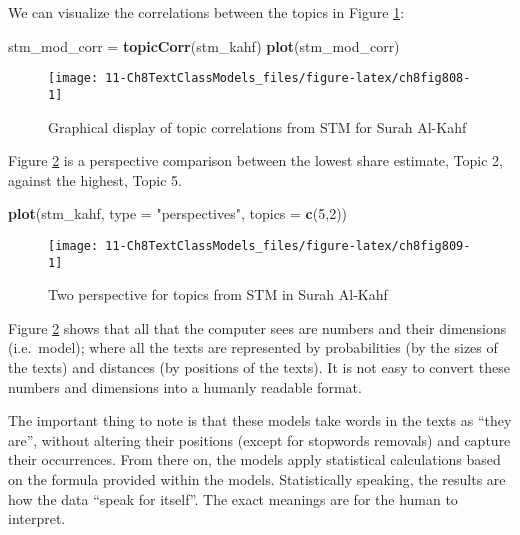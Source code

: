 \documentclass[
]{article}
\newenvironment{Shaded}{\begin{snugshade}}{\end{snugshade}}
\newcommand{\AttributeTok}[1]{\textcolor[rgb]{0.13,0.29,0.53}{#1}}
\newcommand{\DecValTok}[1]{\textcolor[rgb]{0.00,0.00,0.81}{#1}}
\newcommand{\FunctionTok}[1]{\textcolor[rgb]{0.13,0.29,0.53}{\textbf{#1}}}
\newcommand{\NormalTok}[1]{#1}
\newcommand{\OtherTok}[1]{\textcolor[rgb]{0.56,0.35,0.01}{#1}}
\newcommand{\StringTok}[1]{\textcolor[rgb]{0.31,0.60,0.02}{#1}}
\begin{document}
We can visualize the correlations between the topics in Figure \ref{fig:ch8fig808}:

\begin{Shaded}
\begin{Highlighting}[]
\NormalTok{stm\_mod\_corr }\OtherTok{=} \FunctionTok{topicCorr}\NormalTok{(stm\_kahf)}
\FunctionTok{plot}\NormalTok{(stm\_mod\_corr)}
\end{Highlighting}
\end{Shaded}

\begin{figure}

{\centering \texttt{[image: 11-Ch8TextClassModels\_files/figure-latex/ch8fig808-1]} 

}

\caption{Graphical display of topic correlations from STM for Surah Al-Kahf}\label{fig:ch8fig808}
\end{figure}

Figure \ref{fig:ch8fig809} is a perspective comparison between the lowest share estimate, Topic 2, against the highest, Topic 5.

\begin{Shaded}
\begin{Highlighting}[]
\FunctionTok{plot}\NormalTok{(stm\_kahf, }\AttributeTok{type =} \StringTok{"perspectives"}\NormalTok{, }\AttributeTok{topics =} \FunctionTok{c}\NormalTok{(}\DecValTok{5}\NormalTok{,}\DecValTok{2}\NormalTok{))}
\end{Highlighting}
\end{Shaded}

\begin{figure}

{\centering \texttt{[image: 11-Ch8TextClassModels\_files/figure-latex/ch8fig809-1]} 

}

\caption{Two perspective for topics from STM in Surah Al-Kahf}\label{fig:ch8fig809}
\end{figure}

Figure \ref{fig:ch8fig809} shows that all that the computer sees are numbers and their dimensions (i.e.~model); where all the texts are represented by probabilities (by the sizes of the texts) and distances (by positions of the texts). It is not easy to convert these numbers and dimensions into a humanly readable format.

The important thing to note is that these models take words in the texts as ``they are'', without altering their positions (except for stopwords removals) and capture their occurrences. From there on, the models apply statistical calculations based on the formula provided within the models. Statistically speaking, the results are how the data ``speak for itself''. The exact meanings are for the human to interpret.
\end{document}
